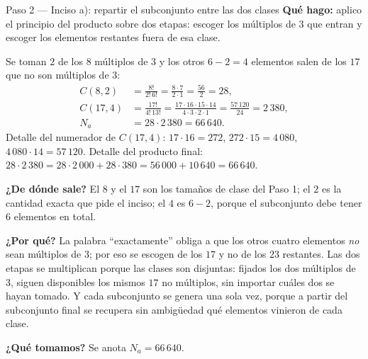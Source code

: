 \documentclass[11pt]{article}
\begin{document}
\begin{paso}{Paso 2 --- Inciso a): repartir el subconjunto entre las dos clases}
\textbf{Qué hago:} aplico el principio del producto sobre dos etapas: escoger los múltiplos de $3$ que entran y escoger los elementos restantes fuera de esa clase.

Se toman $2$ de los $8$ múltiplos de $3$ y los otros $6-2=4$ elementos salen de los $17$ que no son múltiplos de $3$:
\begin{align*}
  C(8,2)&=\frac{8!}{2!\,6!}=\frac{8\cdot 7}{2\cdot 1}=\frac{56}{2}=28,\\
  C(17,4)&=\frac{17!}{4!\,13!}=\frac{17\cdot 16\cdot 15\cdot 14}{4\cdot 3\cdot 2\cdot 1}=\frac{57\,120}{24}=2\,380,\\
  N_a&=28\cdot 2\,380 = 66\,640 .
\end{align*}
Detalle del numerador de $C(17,4)$: $17\cdot 16=272$, $272\cdot 15=4\,080$, $4\,080\cdot 14=57\,120$. Detalle del producto final: $28\cdot 2\,380 = 28\cdot 2\,000 + 28\cdot 380 = 56\,000 + 10\,640 = 66\,640$.

\textbf{¿De dónde sale?} El $8$ y el $17$ son los tamaños de clase del Paso 1; el $2$ es la cantidad exacta que pide el inciso; el $4$ es $6-2$, porque el subconjunto debe tener $6$ elementos en total.

\textbf{¿Por qué?} La palabra ``exactamente'' obliga a que los otros cuatro elementos \emph{no} sean múltiplos de $3$; por eso se escogen de los $17$ y no de los $23$ restantes. Las dos etapas se multiplican porque las clases son disjuntas: fijados los dos múltiplos de $3$, siguen disponibles los mismos $17$ no múltiplos, sin importar cuáles dos se hayan tomado. Y cada subconjunto se genera una sola vez, porque a partir del subconjunto final se recupera sin ambigüedad qué elementos vinieron de cada clase.

\textbf{¿Qué tomamos?} Se anota $N_a=66\,640$.
\end{paso}
\end{document}
